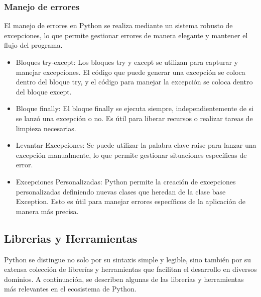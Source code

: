 \documentclass[10pt,a4paper]{article}
\begin{document}
\subsubsection{Manejo de errores}
El manejo de errores en Python se realiza mediante un sistema robusto de excepciones, lo que permite gestionar errores de manera elegante y mantener el flujo del programa.
\begin{itemize}


    \item Bloques try-except: Los bloques try y except se utilizan para capturar y manejar excepciones. El código que puede generar una excepción se coloca dentro del bloque try, y el código para manejar la excepción se coloca dentro del bloque except.

    \item Bloque finally: El bloque finally se ejecuta siempre, independientemente de si se lanzó una excepción o no. Es útil para liberar recursos o realizar tareas de limpieza necesarias.

    \item Levantar Excepciones: Se puede utilizar la palabra clave raise para lanzar una excepción manualmente, lo que permite gestionar situaciones específicas de error.

    \item Excepciones Personalizadas: Python permite la creación de excepciones personalizadas definiendo nuevas clases que heredan de la clase base Exception. Esto es útil para manejar errores específicos de la aplicación de manera más precisa.
\end{itemize}
\subsection{Librerias y Herramientas}

Python se distingue no solo por su sintaxis simple y legible, sino también por su extensa colección de librerías y herramientas que facilitan el desarrollo en diversos dominios. A continuación, se describen algunas de las librerías y herramientas más relevantes en el ecosistema de Python.
\end{document}
